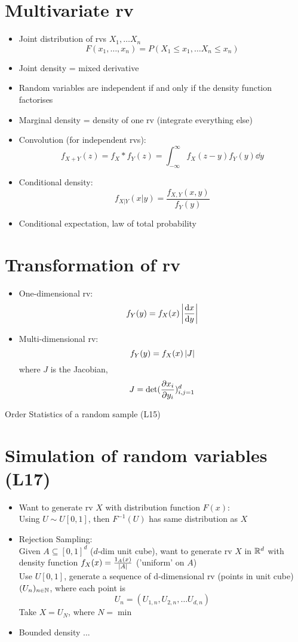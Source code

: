 \section{Multivariate rv}
\begin{itemize}
      \item Joint distribution of rvs $X_1,\dots X_n$ \[F(x_1,\dots,x_n) = P(X_1 \leqslant x_1,\dots X_n \leqslant x_n)\]
      \item Joint density = mixed derivative
      \item Random variables are independent if and only if the density function factorises
      \item Marginal density = density of one rv (integrate everything else)
      \item Convolution (for independent rvs): \[f_{X+Y}(z) = f_X \ast f_Y(z) = \int_{-\infty}^{\infty} f_X(z-y) f_Y(y) \dd y\]
      \item Conditional density: \[f_{X|Y}(x|y) = \frac{f_{X,Y}(x,y)}{f_{Y}(y)}\]
      \item Conditional expectation, law of total probability
\end{itemize}

\section{Transformation of rv}
\begin{itemize}
      \item One-dimensional rv: \[ f_Y(y) = f_X(x) \left| \frac{\mathrm{d}{x}}{\mathrm{d}{y}} \right| \]
      \item Multi-dimensional rv: \[ f_Y(y) = f_X(x) \left| J \right| \] where $J$ is the Jacobian, \[J = \det (\frac{\partial{x_i}}{\partial{y_i}})_{i,j=1}^d \]
\end{itemize}

Order Statistics of a random sample (L15)

\section{Simulation of random variables (L17)}
\begin{itemize}
      \item Want to generate rv $X$ with distribution function $F(x)$: \\
            Using $U \sim U[0,1]$, then $F^{-1}(U)$ has same distribution as $X$

      \item Rejection Sampling: \\
            Given $A \subseteq [0,1]^d$ ($d$-dim unit cube), want to generate rv $X$ in $\mathbb{R}^d$ with density function $f_X(x) = \frac{1_A(x)}{\left| A \right|}$ ('uniform' on $A$) \\

            Use $U[0,1]$, generate a sequence of d-dimensional rv (points in unit cube) $(U_n)_{n\in \mathbb{N}}$, where each point is
            \[U_n = (U_{1,n} , U_{2,n} ,\dots U_{d,n}) \]
            Take $X = U_N$, where $N = \min{}$
      \item Bounded density ...
\end{itemize}

